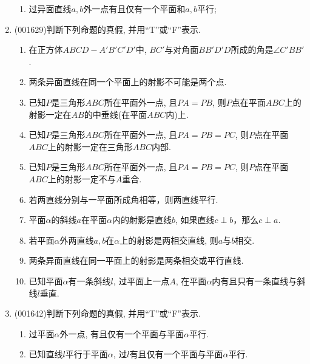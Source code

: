 \documentclass[10pt,a4paper]{article}
\newcommand{\blank}[1]{\underline{\hbox to #1pt{}}}
\begin{document}
\begin{enumerate}[1.]
\begin{enumerate}[\blank{30}(1)]
\item 过异面直线$a,b$外一点有且仅有一个平面和$a,b$平行;\\ 
\end{enumerate}
\item {\tiny (001629)}判断下列命题的真假, 并用``{\rm T}''或``{\rm F}''表示.\\ 
\begin{enumerate}[\blank{30}(1)]
\item 在正方体$ABCD-A'B'C'D'$中, $BC'$与对角面$BB'D'D$所成的角是$\angle C'BB'$.\\ 
\item 两条异面直线在同一个平面上的射影不可能是两个点.\\ 
\item 已知$P$是三角形$ABC$所在平面外一点, 且$PA=PB$, 则$P$点在平面$ABC$上的射影一定在$AB$的中垂线(在平面$ABC$内)上.\\ 
\item 已知$P$是三角形$ABC$所在平面外一点, 且$PA=PB=PC$, 则$P$点在平面$ABC$上的射影一定在三角形$ABC$内部.\\ 
\item 已知$P$是三角形$ABC$所在平面外一点, 且$PA=PB=PC$, 则$P$点在平面$ABC$上的射影一定不与$A$重合.\\ 
\item 若两直线分别与一平面所成角相等，则两直线平行.\\ 
\item 平面$\alpha$的斜线$a$在平面$\alpha$内的射影是直线$b$, 如果直线$c\perp b$，那么$c\perp a$.\\ 
\item 若平面$\alpha$外两直线$a,b$在$\alpha$上的射影是两相交直线, 则$a$与$b$相交.\\ 
\item 两条异面直线在同一平面上的射影是两条相交或平行直线.\\ 
\item 已知平面$\alpha$有一条斜线$l$, 过平面上一点$A$, 在平面$\alpha$内有且只有一条直线与斜线$l$垂直.\\ 
\end{enumerate}
\item {\tiny (001642)}判断下列命题的真假, 并用``{\rm T}''或``{\rm F}''表示.\\ 
\begin{enumerate}[\blank{30}(1)]
\item 过平面$\alpha$外一点, 有且仅有一个平面与平面$\alpha$平行.\\ 
\item 已知直线$l$平行于平面$\alpha$, 过$l$有且仅有一个平面与平面$\alpha$平行.\\ 

\end{enumerate}
\end{enumerate}
\end{document}
